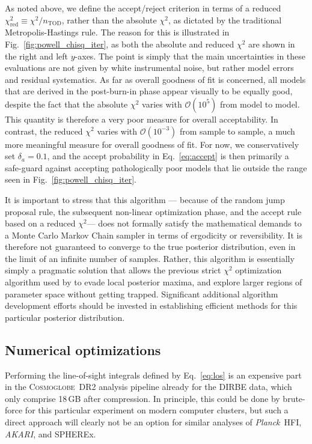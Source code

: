 \documentclass[twocolumn]{aa}
\def\Planck{\textit{Planck}}
\def\AKARI{\textit{AKARI}}
\newcommand{\cosmoglobe}{\textsc{Cosmoglobe}}
\begin{document}
As noted above, we define the accept/reject criterion in terms of a
reduced $\chi^2_{\mathrm{red}}\equiv\chi^2/n_{\mathrm{TOD}}$, rather
than the absolute $\chi^2$, as dictated by the traditional
Metropolis-Hastings rule. The reason for this is illustrated in
Fig.~\ref{fig:powell_chisq_iter}, as both the absolute and reduced
$\chi^2$ are shown in the right and left $y$-axes. The point is simply
that the main uncertainties in these evaluations are not given by white
instrumental noise, but rather model errors and residual
systematics. As far as overall goodness of fit is concerned, all
models that are derived in the post-burn-in phase appear visually to be
equally good, despite the fact that the absolute $\chi^2$ varies with
$\mathcal{O}(10^5)$ from model to model. This quantity is therefore a
very poor measure for overall acceptability. In contrast, the reduced
$\chi^2$ varies with $\mathcal{O}(10^{-3})$ from sample to sample, 
a much more meaningful measure for overall
goodness of fit. For now, we conservatively set $\delta_a = 0.1$, and
the accept probability in Eq.~\eqref{eq:accept} is then primarily a
safe-guard against accepting pathologically poor models that lie
outside the range seen in Fig.~\ref{fig:powell_chisq_iter}. 

It is important to stress that this algorithm --- because of the
random jump proposal rule, the subsequent non-linear optimization
phase, and the accept rule based on a reduced $\chi^2$--- does not
formally satisfy the mathematical demands to a Monte Carlo Markov
Chain sampler in terms of ergodicity or reversibility. It is therefore
not guaranteed to converge to the true posterior distribution, even in
the limit of an infinite number of samples. Rather, this algorithm is
essentially simply a pragmatic solution that allows the previous strict
$\chi^2$ optimization algorithm used by \citet{kelsall1998} to evade
local posterior maxima, and explore larger regions of parameter space
without getting trapped. Significant additional algorithm development
efforts should be invested in establishing efficient methods for this
particular posterior distribution.


\subsection{Numerical optimizations}\label{sect:optimization}

Performing the line-of-sight integrals defined by Eq.~\eqref{eq:los}
is an expensive part in the \cosmoglobe\ DR2 analysis pipeline already
for the DIRBE data, which only comprise 18\,GB after compression. In
principle, this could be done by brute-force for this particular
experiment on modern computer clusters, but such a direct approach
will clearly not be an option for similar analyses of \Planck\ HFI,
\AKARI, and SPHEREx. 
\end{document}
